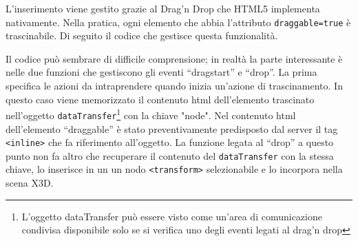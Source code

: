 L'inserimento viene gestito grazie al Drag'n Drop che HTML5 implementa nativamente. Nella pratica, ogni elemento che abbia l'attributo \texttt{draggable=true} è trascinabile. Di seguito il codice che gestisce questa funzionalità.


Il codice può sembrare di difficile comprensione; in realtà la parte interessante è nelle due funzioni che gestiscono gli eventi ``dragstart'' e ``drop''. La prima specifica le azioni da intraprendere quando inizia un'azione di trascinamento. In questo caso viene memorizzato il contenuto html dell'elemento trascinato nell'oggetto \texttt{dataTransfer}\footnote{L'oggetto dataTransfer può essere visto come un'area di comunicazione condivisa disponibile solo se si verifica uno degli eventi legati al drag'n drop} con la chiave "node". Nel contenuto html dell'elemento ``draggable'' è stato preventivamente predisposto dal server il tag \texttt{<inline>} che fa riferimento all'oggetto. La funzione legata al ``drop'' a questo punto non fa altro che recuperare il contenuto del \texttt{dataTransfer} con la stessa chiave, lo inserisce in un un nodo \texttt{<transform>} selezionabile e lo incorpora nella scena X3D.

